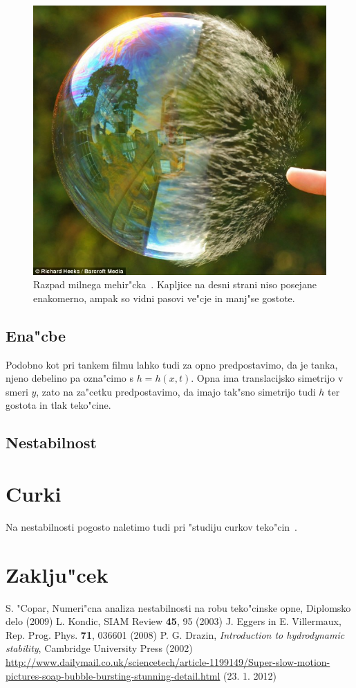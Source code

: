 \documentclass[a4paper,10pt]{article}
\begin{document}
\begin{figure}[h]
 \centering
\includegraphics[width=.8\textwidth]{./Slike/bubble-3}
\caption{Razpad milnega mehir"cka~\cite{slike-mehurcek}. Kapljice na desni strani niso posejane enakomerno, ampak so vidni pasovi ve"cje in manj"se gostote. }
\label{fig:mehurcek-3}
\end{figure}

\subsection{Ena"cbe}

Podobno kot pri tankem filmu lahko tudi za opno predpostavimo, da je tanka, njeno debelino pa ozna"cimo s $h = h(x,t)$. Opna ima translacijsko simetrijo v smeri $y$, zato na za"cetku predpostavimo, da imajo tak"sno simetrijo tudi $h$ ter gostota in tlak teko"cine. 

\subsection{Nestabilnost}

\section{Curki}

Na nestabilnosti pogosto naletimo tudi pri "studiju curkov teko"cin~\cite{eggers}. 


\section{Zaklju"cek}

\begin{thebibliography}{3}
   S. "Copar, Numeri"cna analiza nestabilnosti na robu teko"cinske opne, Diplomsko delo (2009)
   L. Kondic, SIAM Review \textbf{45}, 95 (2003)
   J. Eggers in E. Villermaux, Rep. Prog. Phys. \textbf{71}, 036601 (2008)
   P. G. Drazin, \textit{Introduction to hydrodynamic stability}, Cambridge University Press (2002)
   \url{http://www.dailymail.co.uk/sciencetech/article-1199149/Super-slow-motion-pictures-soap-bubble-bursting-stunning-detail.html} (23. 1. 2012)
\end{thebibliography}
\end{document}
